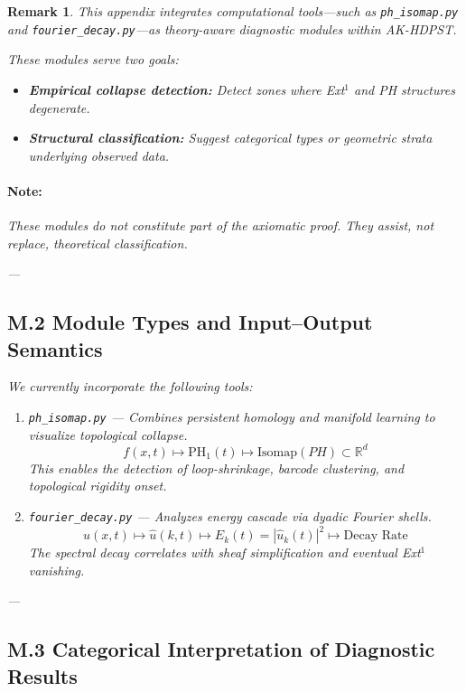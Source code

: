 \documentclass[11pt]{article}
\newtheorem{remark}[theorem]{Remark}
\begin{document}
\begin{remark}
This appendix integrates computational tools—such as \texttt{ph\_isomap.py} and \texttt{fourier\_decay.py}—as theory-aware diagnostic modules within AK-HDPST.

These modules serve two goals:
\begin{itemize}
  \item \textbf{Empirical collapse detection:} Detect zones where Ext$^1$ and PH structures degenerate.
  \item \textbf{Structural classification:} Suggest categorical types or geometric strata underlying observed data.
\end{itemize}

\paragraph{Note:} These modules do not constitute part of the axiomatic proof. They assist, not replace, theoretical classification.

---

\subsection*{M.2 Module Types and Input–Output Semantics}

We currently incorporate the following tools:

\begin{enumerate}
  \item \texttt{ph\_isomap.py} — Combines persistent homology and manifold learning to visualize topological collapse.
    \[
    f(x,t) \mapsto \mathrm{PH}_1(t) \mapsto \text{Isomap}(PH) \subset \mathbb{R}^d
    \]
    This enables the detection of loop-shrinkage, barcode clustering, and topological rigidity onset.

  \item \texttt{fourier\_decay.py} — Analyzes energy cascade via dyadic Fourier shells.
    \[
    u(x,t) \mapsto \widehat{u}(k,t) \mapsto E_k(t) = |\widehat{u}_k(t)|^2 \mapsto \text{Decay Rate}
    \]
    The spectral decay correlates with sheaf simplification and eventual Ext$^1$ vanishing.
\end{enumerate}

---

\subsection*{M.3 Categorical Interpretation of Diagnostic Results}


\end{remark}
\end{document}
